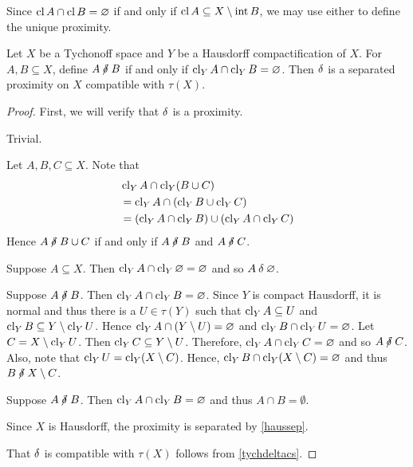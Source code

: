 \begin{remark}
	\label{cpttunique2}
	Since \( \operatorname{cl}{A} \cap \operatorname{cl}{B} = \varnothing \) if and only if \( \operatorname{cl}{A} \subseteq X \setminus \operatorname{int}{B} \), we may use either to define the unique proximity.
\end{remark}

\begin{theorem}
	\label{tychcptfcomp}
	Let \( X \) be a Tychonoff space and \( Y \) be a Hausdorff compactification of \( X \).  For \( A,B \subseteq X \), define \( A \nnear B \) if and only if \( \operatorname{cl}_Y{A} \cap \operatorname{cl}_Y{B} = \varnothing \).  Then \( \mathord{\delta} \) is a separated proximity on \( X \) compatible with \( \tau(X) \).
\end{theorem}
\begin{proof}
	First, we will verify that \( \mathord{\delta} \) is a proximity.
	
		Trivial.
			
		Let \( A,B,C \subseteq X \).  Note that
		\begin{align*}
			&\operatorname{cl}_Y{A} \cap \operatorname{cl}_Y(B \cup C)\\
			&= \operatorname{cl}_Y{A} \cap (\operatorname{cl}_Y{B} \cup \operatorname{cl}_Y{C})\\
			&= ( \operatorname{cl}_Y{A} \cap \operatorname{cl}_Y{B} ) \cup ( \operatorname{cl}_Y{A} \cap \operatorname{cl}_Y{C} )
		\end{align*}
		Hence \( A \nnear B \cup C \) if and only if \( A \nnear B \) and \( A \nnear C \).
			
		Suppose \( A \subseteq X \).  Then \( \operatorname{cl}_Y{A} \cap \operatorname{cl}_Y{\varnothing} = \varnothing \) and so \( A \mathbin{\delta} \varnothing \).
			
		Suppose \( A \nnear B \).  Then \( \operatorname{cl}_Y{A} \cap \operatorname{cl}_Y{B} = \varnothing \).  Since \( Y \) is compact Hausdorff, it is normal \cite{kelley} and thus there is a \( U \in \tau(Y) \) such that \( \operatorname{cl}_Y{A} \subseteq U \) and \( \operatorname{cl}_Y{B} \subseteq Y \setminus \operatorname{cl}_Y{U} \).  Hence \( \operatorname{cl}_Y{A} \cap (Y \setminus U) = \varnothing \) and \( \operatorname{cl}_Y{B} \cap \operatorname{cl}_Y{U} = \varnothing \).  Let \( C = X \setminus \operatorname{cl}_Y{U} \).  Then \( \operatorname{cl}_Y{C} \subseteq Y \setminus U \).  Therefore, \( \operatorname{cl}_Y{A} \cap \operatorname{cl}_Y{C} = \varnothing \) and so \( A \nnear C \).  Also, note that \( \operatorname{cl}_Y{U} = \operatorname{cl}_Y(X \setminus C) \).  Hence, \( \operatorname{cl}_Y{B} \cap \operatorname{cl}_Y(X \setminus C) = \varnothing \) and thus \( B \nnear X \setminus C \).
			
	 Suppose \( A \nnear B \).  Then \( \operatorname{cl}_Y{A} \cap \operatorname{cl}_Y{B} = \varnothing \) and thus \( A \cap B = \emptyset \).
			
	 Since \( X \) is Hausdorff, the proximity is separated by \ref{haussep}.
	
	That \( \mathord{\delta} \) is compatible with \( \tau(X) \) follows from \ref{tychdeltacs}.
\end{proof}

